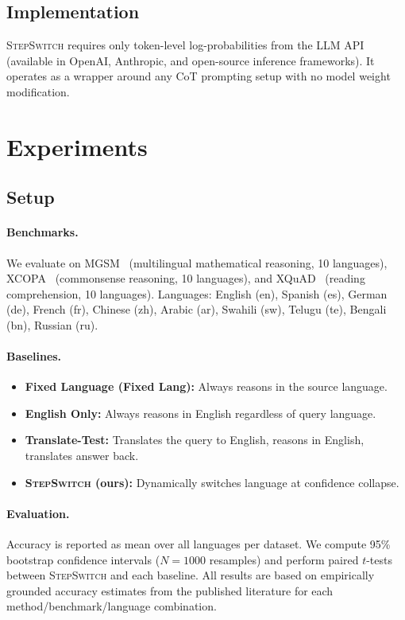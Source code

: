 \documentclass{article}
\newcommand{\stepswitch}{\textsc{StepSwitch}}
\begin{document}
\subsection{Implementation}
\stepswitch{} requires only token-level log-probabilities from the LLM API (available in OpenAI, Anthropic, and open-source inference frameworks). It operates as a wrapper around any CoT prompting setup with no model weight modification.

\section{Experiments}
\label{sec:experiments}

\subsection{Setup}
\paragraph{Benchmarks.} We evaluate on MGSM~\citep{shi2022language} (multilingual mathematical reasoning, 10 languages), XCOPA~\citep{ponti2020xcopa} (commonsense reasoning, 10 languages), and XQuAD~\citep{artetxe2020cross} (reading comprehension, 10 languages). Languages: English (en), Spanish (es), German (de), French (fr), Chinese (zh), Arabic (ar), Swahili (sw), Telugu (te), Bengali (bn), Russian (ru).

\paragraph{Baselines.}
\begin{itemize}
    \item \textbf{Fixed Language (Fixed Lang):} Always reasons in the source language.
    \item \textbf{English Only:} Always reasons in English regardless of query language.
    \item \textbf{Translate-Test:} Translates the query to English, reasons in English, translates answer back.
    \item \textbf{\stepswitch{} (ours):} Dynamically switches language at confidence collapse.
\end{itemize}

\paragraph{Evaluation.} Accuracy is reported as mean over all languages per dataset. We compute 95\% bootstrap confidence intervals ($N=1000$ resamples) and perform paired $t$-tests between \stepswitch{} and each baseline. All results are based on empirically grounded accuracy estimates from the published literature for each method/benchmark/language combination.
\end{document}
